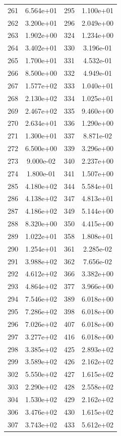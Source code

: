 \documentclass[12pt]{article}
\begin{document}
\begin{longtable}{@{}cccc@{}}
261 & 6.564e+01 & 295 & 1.100e+01 \\
262 & 3.200e+01 & 296 & 2.049e+00 \\
263 & 1.902e+00 & 324 & 1.234e+00 \\
264 & 3.402e+01 & 330 & 3.196e-01 \\
265 & 1.700e+01 & 331 & 4.532e-01 \\
266 & 8.500e+00 & 332 & 4.949e-01 \\
267 & 1.577e+02 & 333 & 1.040e+01 \\
268 & 2.130e+02 & 334 & 1.025e+01 \\
269 & 2.467e+02 & 335 & 9.460e+00 \\
270 & 2.634e+01 & 336 & 1.290e+00 \\
271 & 1.300e+01 & 337 & 8.871e-02 \\
272 & 6.500e+00 & 339 & 3.296e+00 \\
273 & 9.000e-02 & 340 & 2.237e+00 \\
274 & 1.800e-01 & 341 & 1.507e+00 \\
285 & 4.180e+02 & 344 & 5.584e+01 \\
286 & 4.138e+02 & 347 & 4.813e+01 \\
287 & 4.186e+02 & 349 & 5.144e+00 \\
288 & 8.320e+00 & 350 & 4.415e+00 \\
289 & 1.022e+01 & 358 & 1.808e+01 \\
290 & 1.254e+01 & 361 & 2.285e-02 \\
291 & 3.988e+02 & 362 & 7.656e-02 \\
292 & 4.612e+02 & 366 & 3.382e+00 \\
293 & 4.864e+02 & 377 & 3.966e+00 \\
294 & 7.546e+02 & 389 & 6.018e+00 \\
295 & 7.286e+02 & 398 & 6.018e+00 \\
296 & 7.026e+02 & 407 & 6.018e+00 \\
297 & 3.277e+02 & 416 & 6.018e+00 \\
298 & 3.385e+02 & 425 & 2.893e+02 \\
299 & 3.589e+02 & 426 & 2.162e+02 \\
302 & 5.550e+02 & 427 & 1.615e+02 \\
303 & 2.290e+02 & 428 & 2.558e+02 \\
304 & 1.530e+02 & 429 & 2.162e+02 \\
306 & 3.476e+02 & 430 & 1.615e+02 \\
307 & 3.743e+02 & 433 & 5.612e+02 \\

\end{longtable}
\end{document}
